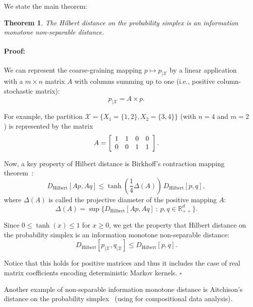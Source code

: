 \documentclass{article}
\newenvironment{proof}{\paragraph{Proof:}}{\hfill$\square$}
\newtheorem{theorem}{Theorem}
\def\bbR{\mathbb{R}}
\def\bbR{\mathbb{R}}
\def\calX{\mathcal{X}}
\def\Hilbert{\mathrm{Hilbert}}
\begin{document}
We state the main theorem:

\begin{theorem}
The Hilbert distance on the probability simplex is an information monotone non-separable distance.
\end{theorem}

\begin{proof}
We can represent the coarse-graining mapping $p\mapsto p_{|\calX}$ by a linear application with a $m\times n$ matrix $A$ with columns  summing  up to one (i.e., positive column-stochastic matrix):
$$
p_{|\calX} = A \times p.
$$

For example, the partition $\calX=\{X_1=\{1,2\},X_2=\{3,4\}\}$ (with $n=4$ and $m=2$) is represented by the matrix
$$
A=\left[\begin{array}{llll}1&1&0&0\cr 0&0&1&1\end{array}\right].
$$

Now, a key property of Hilbert distance is Birkhoff's contraction mapping theorem~\cite{birkhoff1957extensions,bushell1973projective}:
$$
D_\Hilbert[Ap,Aq]\leq \tanh\left(\frac{1}{4}\Delta(A)\right)\, D_\Hilbert[p,q],
$$
where $\Delta(A)$ is called the projective diameter of the positive mapping $A$:
$$
\Delta(A)=\sup\{D_\Hilbert[Ap,Aq]\ :\ p,q\in\bbR_{++}^d\}.
$$


Since $0\leq \tanh(x)\leq 1$ for $x\geq 0$, we get the property that  Hilbert distance on the probability simplex is an information monotone non-separable distance:
$$
D_\Hilbert[p_{|\calX},q_{|\calX}]\leq D_\Hilbert[p,q].
$$

Notice that this holds for positive matrices and thus it includes the case of real matrix coefficients encoding deterministic Markov kernels.
\end{proof}

Another example of non-separable information monotone distance is Aitchison's distance on the probability simplex~\cite{erb2021information} (using for compositional data analysis).



\end{document}
